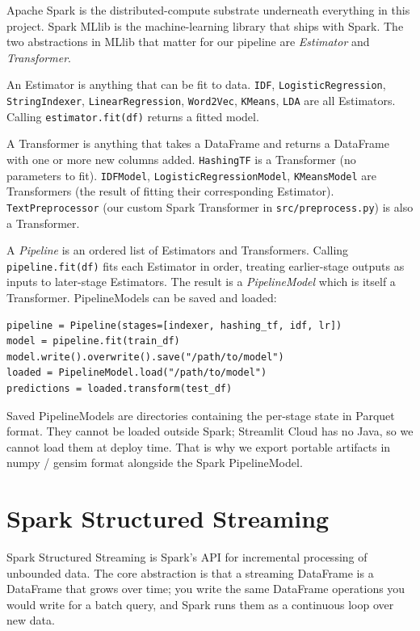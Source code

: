\documentclass[11pt,letterpaper]{book}
\begin{document}
Apache Spark \cite{zaharia2010spark} is the distributed-compute substrate underneath everything in this project. Spark MLlib \cite{meng2016mllib} is the machine-learning library that ships with Spark. The two abstractions in MLlib that matter for our pipeline are \emph{Estimator} and \emph{Transformer}.

An Estimator is anything that can be fit to data. \texttt{IDF}, \texttt{LogisticRegression}, \texttt{StringIndexer}, \texttt{LinearRegression}, \texttt{Word2Vec}, \texttt{KMeans}, \texttt{LDA} are all Estimators. Calling \texttt{estimator.fit(df)} returns a fitted model.

A Transformer is anything that takes a DataFrame and returns a DataFrame with one or more new columns added. \texttt{HashingTF} is a Transformer (no parameters to fit). \texttt{IDFModel}, \texttt{LogisticRegressionModel}, \texttt{KMeansModel} are Transformers (the result of fitting their corresponding Estimator). \texttt{TextPreprocessor} (our custom Spark Transformer in \texttt{src/preprocess.py}) is also a Transformer.

A \emph{Pipeline} is an ordered list of Estimators and Transformers. Calling \texttt{pipeline.fit(df)} fits each Estimator in order, treating earlier-stage outputs as inputs to later-stage Estimators. The result is a \emph{PipelineModel} which is itself a Transformer. PipelineModels can be saved and loaded:
\begin{lstlisting}
pipeline = Pipeline(stages=[indexer, hashing_tf, idf, lr])
model = pipeline.fit(train_df)
model.write().overwrite().save("/path/to/model")
loaded = PipelineModel.load("/path/to/model")
predictions = loaded.transform(test_df)
\end{lstlisting}

Saved PipelineModels are directories containing the per-stage state in Parquet format. They cannot be loaded outside Spark; Streamlit Cloud has no Java, so we cannot load them at deploy time. That is why we export portable artifacts in numpy / gensim format alongside the Spark PipelineModel.

\section{Spark Structured Streaming}

Spark Structured Streaming is Spark's API for incremental processing of unbounded data. The core abstraction is that a streaming DataFrame is a DataFrame that grows over time; you write the same DataFrame operations you would write for a batch query, and Spark runs them as a continuous loop over new data.
\end{document}
